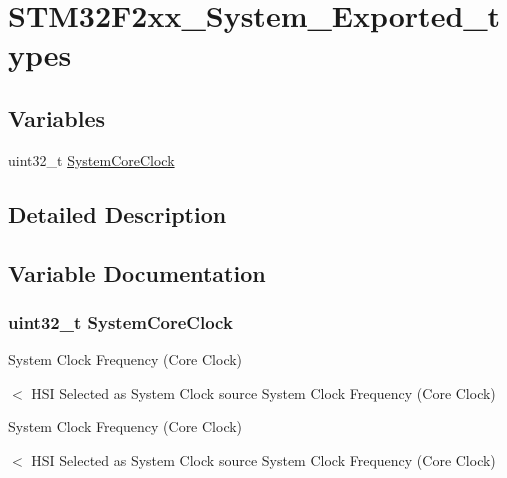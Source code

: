 \hypertarget{group___s_t_m32_f2xx___system___exported__types}{\section{S\-T\-M32\-F2xx\-\_\-\-System\-\_\-\-Exported\-\_\-types}
\label{group___s_t_m32_f2xx___system___exported__types}
}
\subsection*{Variables}
\begin{DoxyCompactItemize}
\item 
uint32\-\_\-t \hyperlink{group___s_t_m32_f2xx___system___exported__types_gaa3cd3e43291e81e795d642b79b6088e6}{System\-Core\-Clock}
\end{DoxyCompactItemize}


\subsection{Detailed Description}


\subsection{Variable Documentation}
\hypertarget{group___s_t_m32_f2xx___system___exported__types_gaa3cd3e43291e81e795d642b79b6088e6}{
\subsubsection[{System\-Core\-Clock}]{\setlength{\rightskip}{0pt plus 5cm}uint32\-\_\-t System\-Core\-Clock}}\label{group___s_t_m32_f2xx___system___exported__types_gaa3cd3e43291e81e795d642b79b6088e6}
System Clock Frequency (Core Clock)

$<$ H\-S\-I Selected as System Clock source System Clock Frequency (Core Clock)

System Clock Frequency (Core Clock)

$<$ H\-S\-I Selected as System Clock source System Clock Frequency (Core Clock) 